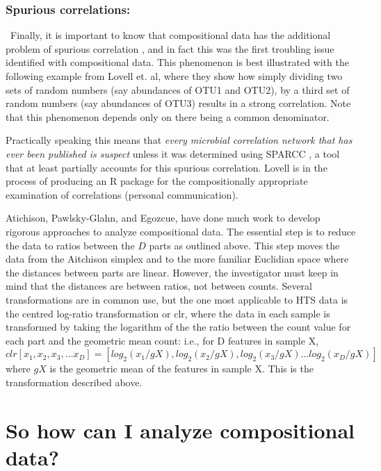 \documentclass[11pt]{article}\usepackage[]{graphicx}\usepackage[]{color}
\begin{document}
\subsubsection{Spurious correlations:}~Finally, it is important to know that compositional data has the additional problem of  spurious correlation \cite{Pearson:1896}, and in fact this was the first troubling issue identified with compositional data. This phenomenon is best illustrated with  the following example from Lovell et. al\cite{Lovell:2015aa}, where they show how simply dividing two sets of random numbers (say abundances of OTU1 and OTU2), by a third set of random numbers (say abundances of OTU3) results in a strong correlation. Note that this phenomenon depends only on there being a common denominator.

Practically speaking this means that \emph{every microbial correlation network that has ever been published is suspect} unless it was determined using SPARCC \cite{Friedman:2012}, a tool that at least partially accounts for this spurious correlation. Lovell is in the process of producing an R package for the compositionally appropriate examination of correlations (personal communication).



Atichison\cite{Aitchison:1986}, Pawlsky-Glahn\cite{Pawlowsky-Glahn:2006}, and Egozcue\cite{egozcue2005}, have done much work to develop rigorous approaches to analyze compositional data\cite{pawlowsky2011compositional}. The essential step is to reduce the data to ratios between the $D$ parts as outlined above. This step moves the data from the Aitchison simplex and to the more familiar Euclidian space where the distances between parts are linear. However, the investigator must keep in mind that the distances are between ratios, not between counts. Several transformations are in common use, but the one most applicable to HTS data is the centred log-ratio transformation or clr, where the data in each sample is transformed by taking the logarithm of the the ratio between the count value for each part and the geometric mean count: i.e., for D features in sample X, $clr [x_1, x_2, x_3, \ldots x_D] = [log_2(x_1/gX), log_2(x_2/gX), log_2(x_3/gX) \ldots log_2(x_D/gX)]$ where $gX$ is the geometric mean of the features in sample X. This is the transformation described above.


\section{So how can I analyze compositional data?}
\end{document}
